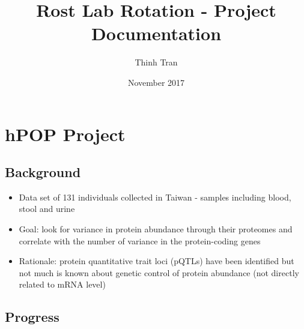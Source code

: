 \documentclass[12pt, letterpaper]{article}
\title{Rost Lab Rotation - Project Documentation}
\author{Thinh Tran}
\date{November 2017}
\begin{document}
 
\begin{titlepage}
\maketitle
\end{titlepage}

\section{hPOP Project}

\subsection{Background}
\begin{itemize}
	\item Data set of 131 individuals collected in Taiwan - samples including blood, stool and urine
	\item Goal: look for variance in protein abundance through their proteomes and correlate with the number of variance in the protein-coding genes
	\item Rationale: protein quantitative trait loci (pQTLs) have been identified but not much is known about genetic control of protein abundance (not directly related to mRNA level)
\end{itemize}


\subsection{Progress}
\end{document}
